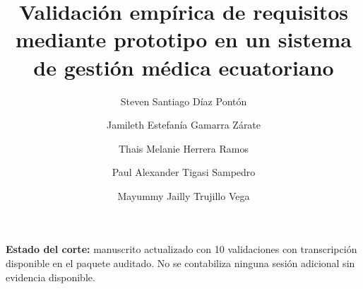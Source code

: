\documentclass[runningheads]{llncs}
\begin{document}
	\raggedbottom
	
	\title{Validación empírica de requisitos mediante prototipo en un sistema de gestión médica ecuatoriano}
	
	
	\author{Steven Santiago Díaz Pontón \and
		Jamileth Estefanía Gamarra Zárate \and
		Thais Melanie Herrera Ramos \and
		Paul Alexander Tigasi Sampedro \and
		Mayummy Jailly Trujillo Vega}
	
	
	
	\maketitle
	
	\begin{center}
		\small\textbf{Estado del corte:} manuscrito actualizado con 10 validaciones con transcripción disponible en el paquete auditado. No se contabiliza ninguna sesión adicional sin evidencia disponible.
	\end{center}
	
\end{document}
